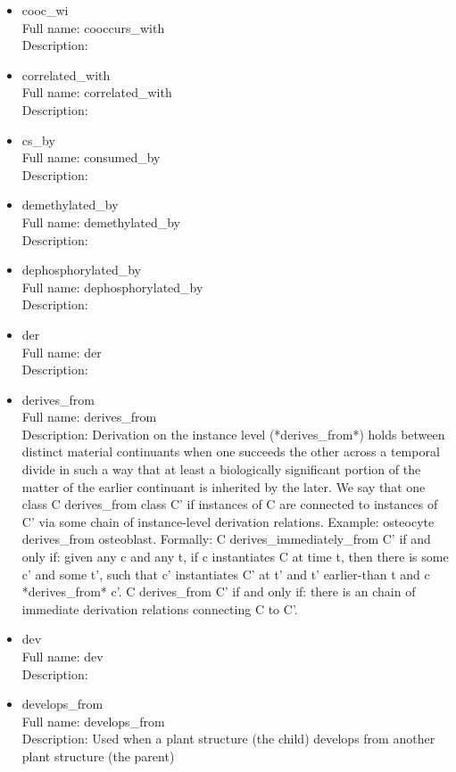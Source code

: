 \begin{itemize}
\item{cooc\_wi}\\ Full name: cooccurs\_with\\ Description: 

\item{correlated\_with}\\ Full name: correlated\_with\\ Description: 

\item{cs\_by}\\ Full name: consumed\_by\\ Description: 

\item{demethylated\_by}\\ Full name: demethylated\_by\\ Description: 

\item{dephosphorylated\_by}\\ Full name: dephosphorylated\_by\\ Description: 

\item{der}\\ Full name: der\\ Description: 

\item{derives\_from}\\ Full name: derives\_from\\ Description: Derivation on the instance level (*derives\_from*) holds between distinct material continuants when one succeeds the other across a temporal divide in such a way that at least a biologically significant portion of the matter of the earlier continuant is inherited by the later. We say that one class C derives\_from class C' if instances of C are connected to instances of C' via some chain of instance-level derivation relations. Example: osteocyte derives\_from osteoblast. Formally: C derives\_immediately\_from C' if and only if: given any c and any t, if c instantiates C at time t, then there is some c' and some t', such that c' instantiates C' at t' and t' earlier-than t and c *derives\_from* c'. C derives\_from C' if and only if: there is an chain of immediate derivation relations connecting C to C'. 

\item{dev}\\ Full name: dev\\ Description: 

\item{develops\_from}\\ Full name: develops\_from\\ Description: Used when a plant structure (the child) develops from another plant structure (the parent) 


\end{itemize}
